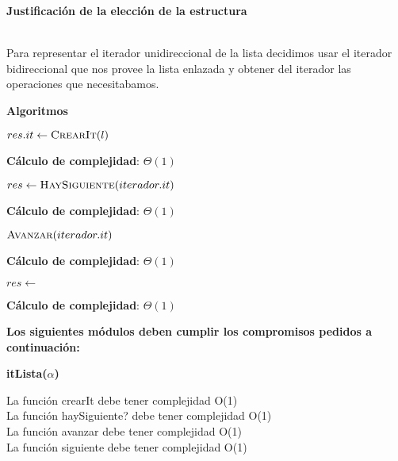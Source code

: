 \documentclass[10pt, a4paper]{article}
\let\TipoVariable=\texttt
\let\ModificadorArgumento=\textbf
\newcommand{\In}[2]{\ModificadorArgumento{in} \ensuremath{#1}\,: \TipoVariable{#2}\xspace}
\newcommand{\Inout}[2]{\ModificadorArgumento{in/out} \ensuremath{#1}\,: \TipoVariable{#2}\xspace}
\newenvironment{Servicios Usados}{%
  \vspace*{2ex}
  \noindent\textbf{\Large Servicios Usados}%
  \vspace*{2ex}
}{}
\newenvironment{Algoritmos}{%
  \vspace*{2ex}%
  \noindent\textbf{\Large Algoritmos}%
  \vspace*{2ex}%
}{}
\newenvironment{Algoritmos Del Iterador}{%
  \vspace*{2ex}%
  \noindent\textbf{\Large Algoritmos Del Iterador}%
  \vspace*{2ex}%
}{}
\newenvironment{Justificacion}{%
  \vspace*{2ex}%
  \noindent\textbf{\Large Justificaci\'on de la elecci\'on de la estructura}%
  \vspace*{2ex}%
}{}
\newcommand{\modTitulo}[1]{
  \vspace*{1ex}\par\noindent\textbf{\large #1}\par
}
\newcommand{\DRef}{\ensuremath{\rightarrow}}
\begin{document}
\begin{Justificacion}
\\Para representar el iterador unidireccional de la lista decidimos usar el iterador bidireccional que nos provee la lista enlazada y obtener del iterador las operaciones que necesitabamos.

\end{Justificacion}

\begin{Algoritmos}

\begin{algorithm}[H]
\caption*{iCrearIterador(\In{l}{lista($\alpha$)}) $\DRef res$ : \TipoVariable{iteradorUni($\alpha$)}}
\begin{algorithmic}[1]
	\State $res.it \gets \Call{CrearIt}{l}$
\end{algorithmic}
\textbf{C\'alculo de complejidad}: $\Theta(1)$
\end{algorithm}

\begin{algorithm}[H]
\caption*{iHayMas?(\In{iterador}{iteradorUni($\alpha$)}) $\DRef res$ : \TipoVariable{Bool}}
\begin{algorithmic}[1]
	\State $res \gets \Call{HaySiguiente}{iterador.it}$
\end{algorithmic}
	\textbf{C\'alculo de complejidad}: $\Theta(1)$
\end{algorithm}

\begin{algorithm}[H]
\caption*{iSiguiente(\Inout{iterador}{iteradorUni($\alpha$)})}
\begin{algorithmic}[1]
	\State $\Call{Avanzar}{iterador.it}$
\end{algorithmic}
	\textbf{C\'alculo de complejidad}: $\Theta(1)$
\end{algorithm}

\begin{algorithm}[H]
\caption*{iActual(\In{iterador}{iteradorUni($\alpha$)}) $\DRef res$ : {$\alpha$}}
\begin{algorithmic}[1]
	\State $res \gets$ 
\end{algorithmic}
	\textbf{C\'alculo de complejidad}: $\Theta(1)$
\end{algorithm}

\end{Algoritmos}

\begin{Servicios Usados}

\textbf{Los siguientes m\'odulos deben cumplir los compromisos pedidos a continuaci\'on:}

\modTitulo{itLista($\alpha$)}

La función crearIt debe tener complejidad O(1)\\
La función haySiguiente? debe tener complejidad O(1)\\
La función avanzar debe tener complejidad O(1)\\
La función siguiente debe tener complejidad O(1)

\end{Servicios Usados}
\end{document}
